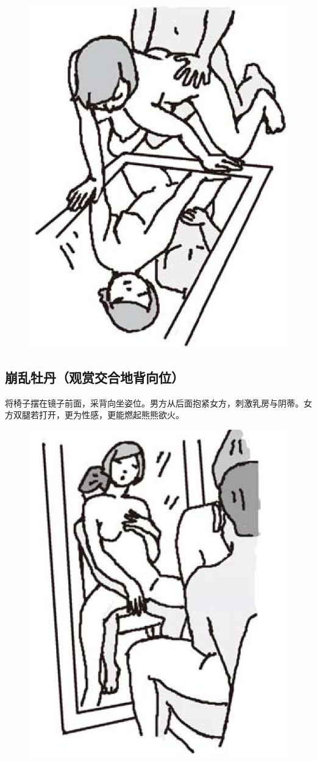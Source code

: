 \documentclass[12pt,UTF8]{ctexbook}
\begin{document}
\begin{figure}[htbp]
\centering
\includegraphics[width=0.7\linewidth]{tw30}
\caption{}
\label{fig:1}
\end{figure}

\subsection{崩乱牡丹（观赏交合地背向位）}

将椅子摆在镜子前面，采背向坐姿位。男方从后面抱紧女方，刺激乳房与阴蒂。女方双腿若打开，更为性感，更能燃起熊熊欲火。

\begin{figure}[htbp]
\centering
\includegraphics[width=0.7\linewidth]{tw31}
\caption{}
\label{fig:1}
\end{figure}
\end{document}
